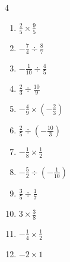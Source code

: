 \begin{multicols}{4}
\begin{enumerate}
  \item $\displaystyle \frac{2}{5}\times{}\frac{9}{5}$


  \item $\displaystyle -\frac{7}{4}\div{}\frac{8}{7}$


  \item $\displaystyle -\frac{1}{10}\div{}\frac{4}{5}$


  \item $\displaystyle \frac{2}{3}\div{}\frac{10}{9}$


\columnbreak %

  \item $\displaystyle -\frac{4}{9}\times{}\left(-\frac{2}{3}\right)$


  \item $\displaystyle \frac{2}{5}\div{}\left(-\frac{10}{3}\right)$


  \item $\displaystyle -\frac{1}{8}\times{}\frac{1}{2}$


  \item $\displaystyle -\frac{5}{2}\div{}\left(-\frac{1}{10}\right)$

        \phantom{$\displaystyle =25$}

  \item $\displaystyle \frac{3}{5}\div{}\frac{1}{7}$


  \item $\displaystyle 3\times{}\frac{3}{8}$


  \item $\displaystyle -\frac{1}{4}\times{}\frac{1}{2}$


  \item $\displaystyle -2\times{}1$


\end{enumerate}
\end{multicols}
